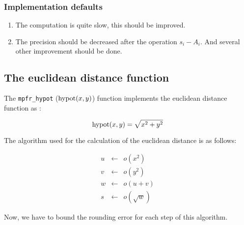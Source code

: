 \documentclass[12pt]{amsart}
\begin{document}
\subsubsection{Implementation defaults}
\begin{enumerate}
\item The computation is quite slow, this should be improved.
\item The precision should be decreased after the operation $s_i-A_i$. And several other improvement should be done.
\end{enumerate}

\subsection{The euclidean distance function}

The {\tt mpfr\_hypot} ($\textnormal{hypot}(x,y)$) function implements the euclidean distance function  as :

\[
\textnormal{hypot} (x,y) = \sqrt{x^2+y^2}
\]

The algorithm used for the calculation of the euclidean distance is as follows:

\begin{eqnarray}\nonumber
u&\leftarrow&o(x^2)\\\nonumber
v&\leftarrow&o({y}^{2})\\\nonumber
w&\leftarrow&o(u+v)\\\nonumber
s&\leftarrow&o(\sqrt{w})
\end{eqnarray}

Now, we have to bound the rounding error for each step of this
algorithm.  
\end{document}
